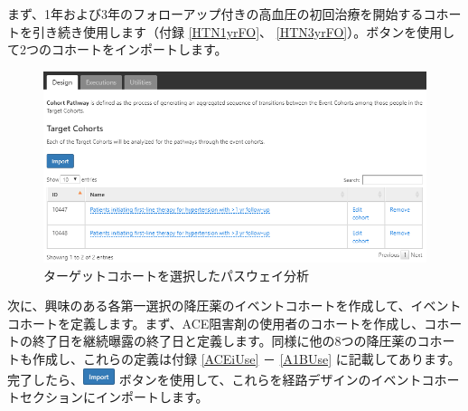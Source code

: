 \documentclass[
  11pt]{book}
\theoremstyle{definition}
\theoremstyle{definition}
\theoremstyle{definition}
\theoremstyle{definition}
\theoremstyle{remark}
\begin{document}
まず、1年および3年のフォローアップ付きの高血圧の初回治療を開始するコホートを引き続き使用します（付録 \ref{HTN1yrFO}、 \ref{HTN3yrFO}）。ボタンを使用して2つのコホートをインポートします。

\begin{figure}

{\centering \includegraphics[width=1\linewidth]{images/Characterization/atlasPathwaysTargetCohorts} 

}

\caption{ターゲットコホートを選択したパスウェイ分析}\label{fig:atlasPathwaysTargetCohorts}
\end{figure}

次に、興味のある各第一選択の降圧薬のイベントコホートを作成して、イベントコホートを定義します。まず、ACE阻害剤の使用者のコホートを作成し、コホートの終了日を継続曝露の終了日と定義します。同様に他の8つの降圧薬のコホートも作成し、これらの定義は付録 \ref{ACEiUse} － \ref{A1BUse} に記載してあります。完了したら、\includegraphics{images/Characterization/atlasImportButton.png} ボタンを使用して、これらを経路デザインのイベントコホートセクションにインポートします。
\end{document}
